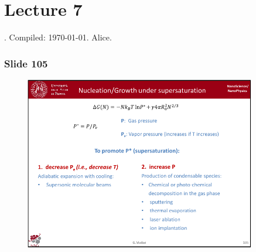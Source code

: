 \documentclass[../main/main.tex]{subfiles}
\begin{document}
\section{Lecture 7}
 . Compiled:  \today. Alice.

\subsubsection{Slide 105}

\begin{figure}[h!]
\centering
\includegraphics[page=1,width=0.9\textwidth]{../lessons/pdf_file/7_lesson.pdf}
\end{figure}
\end{document}

